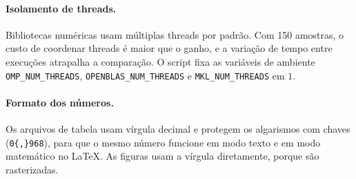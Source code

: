 \paragraph{Isolamento de threads.} Bibliotecas numéricas usam múltiplas threads por padrão. Com
150 amostras, o custo de coordenar threads é maior que o ganho, e a variação de tempo entre
execuções atrapalha a comparação. O script fixa as variáveis de ambiente
\texttt{OMP\_NUM\_THREADS}, \texttt{OPENBLAS\_NUM\_THREADS} e \texttt{MKL\_NUM\_THREADS} em $1$.

\paragraph{Formato dos números.} Os arquivos de tabela usam vírgula decimal e protegem os
algarismos com chaves (\texttt{0\{,\}968}), para que o mesmo número funcione em modo texto e em
modo matemático no \LaTeX{}. As figuras usam a vírgula diretamente, porque são rasterizadas.

